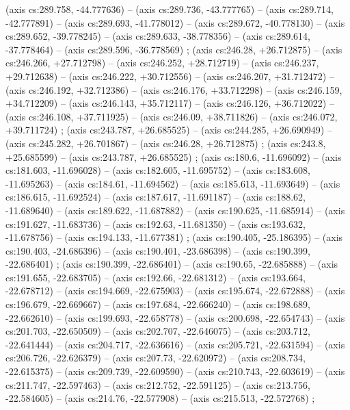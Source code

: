     (axis cs:289.758,    -44.777636) --  (axis cs:289.736,    -43.777765) --  (axis cs:289.714,    -42.777891) --  (axis cs:289.693,    -41.778012) --  (axis cs:289.672,    -40.778130) --  (axis cs:289.652,    -39.778245) --  (axis cs:289.633,    -38.778356) --  (axis cs:289.614,    -37.778464) --  (axis cs:289.596,    -36.778569) ;
    (axis cs:246.28,    +26.712875) --  (axis cs:246.266,    +27.712798) --  (axis cs:246.252,    +28.712719) --  (axis cs:246.237,    +29.712638) --  (axis cs:246.222,    +30.712556) --  (axis cs:246.207,    +31.712472) --  (axis cs:246.192,    +32.712386) --  (axis cs:246.176,    +33.712298) --  (axis cs:246.159,    +34.712209) --  (axis cs:246.143,    +35.712117) --  (axis cs:246.126,    +36.712022) --  (axis cs:246.108,    +37.711925) --  (axis cs:246.09,    +38.711826) --  (axis cs:246.072,    +39.711724) ;
    (axis cs:243.787,    +26.685525) --  (axis cs:244.285,    +26.690949) --  (axis cs:245.282,    +26.701867) --  (axis cs:246.28,    +26.712875) ;
    (axis cs:243.8,    +25.685599) --  (axis cs:243.787,    +26.685525) ;
    (axis cs:180.6,    -11.696092) --  (axis cs:181.603,    -11.696028) --  (axis cs:182.605,    -11.695752) --  (axis cs:183.608,    -11.695263) --  (axis cs:184.61,    -11.694562) --  (axis cs:185.613,    -11.693649) --  (axis cs:186.615,    -11.692524) --  (axis cs:187.617,    -11.691187) --  (axis cs:188.62,    -11.689640) --  (axis cs:189.622,    -11.687882) --  (axis cs:190.625,    -11.685914) --  (axis cs:191.627,    -11.683736) --  (axis cs:192.63,    -11.681350) --  (axis cs:193.632,    -11.678756) --  (axis cs:194.133,    -11.677381) ;
    (axis cs:190.405,    -25.186395) --  (axis cs:190.403,    -24.686396) --  (axis cs:190.401,    -23.686398) --  (axis cs:190.399,    -22.686401) ;
    (axis cs:190.399,    -22.686401) --  (axis cs:190.65,    -22.685888) --  (axis cs:191.655,    -22.683705) --  (axis cs:192.66,    -22.681312) --  (axis cs:193.664,    -22.678712) --  (axis cs:194.669,    -22.675903) --  (axis cs:195.674,    -22.672888) --  (axis cs:196.679,    -22.669667) --  (axis cs:197.684,    -22.666240) --  (axis cs:198.689,    -22.662610) --  (axis cs:199.693,    -22.658778) --  (axis cs:200.698,    -22.654743) --  (axis cs:201.703,    -22.650509) --  (axis cs:202.707,    -22.646075) --  (axis cs:203.712,    -22.641444) --  (axis cs:204.717,    -22.636616) --  (axis cs:205.721,    -22.631594) --  (axis cs:206.726,    -22.626379) --  (axis cs:207.73,    -22.620972) --  (axis cs:208.734,    -22.615375) --  (axis cs:209.739,    -22.609590) --  (axis cs:210.743,    -22.603619) --  (axis cs:211.747,    -22.597463) --  (axis cs:212.752,    -22.591125) --  (axis cs:213.756,    -22.584605) --  (axis cs:214.76,    -22.577908) --  (axis cs:215.513,    -22.572768) ;
